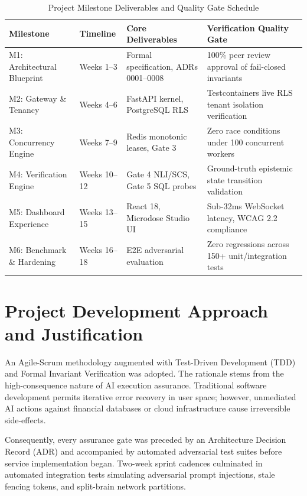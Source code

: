 \documentclass[12pt,a4paper]{report}
\numberwithin{equation}{section}
\begin{document}
\begin{table}[h!]
\centering
\caption{Project Milestone Deliverables and Quality Gate Schedule}
\vspace{4pt}
\begin{tabularx}{\textwidth}{l l p{3.2cm} X}
\toprule
\textbf{Milestone} & \textbf{Timeline} & \textbf{Core Deliverables} & \textbf{Verification Quality Gate} \\
\midrule
M1: Architectural Blueprint & Weeks 1--3 & Formal specification, ADRs 0001--0008 & 100\% peer review approval of fail-closed invariants \\
M2: Gateway \& Tenancy & Weeks 4--6 & FastAPI kernel, PostgreSQL RLS & Testcontainers live RLS tenant isolation verification \\
M3: Concurrency Engine & Weeks 7--9 & Redis monotonic leases, Gate 3 & Zero race conditions under 100 concurrent workers \\
M4: Verification Engine & Weeks 10--12 & Gate 4 NLI/SCS, Gate 5 SQL probes & Ground-truth epistemic state transition validation \\
M5: Dashboard Experience & Weeks 13--15 & React 18, Microdose Studio UI & Sub-32ms WebSocket latency, WCAG 2.2 compliance \\
M6: Benchmark \& Hardening & Weeks 16--18 & E2E adversarial evaluation & Zero regressions across 150+ unit/integration tests \\
\bottomrule
\end{tabularx}
\end{table}

\section{Project Development Approach and Justification}
An Agile-Scrum methodology augmented with Test-Driven Development (TDD) and Formal Invariant Verification was adopted. The rationale stems from the high-consequence nature of AI execution assurance. Traditional software development permits iterative error recovery in user space; however, unmediated AI actions against financial databases or cloud infrastructure cause irreversible side-effects.

Consequently, every assurance gate was preceded by an Architecture Decision Record (ADR) and accompanied by automated adversarial test suites before service implementation began. Two-week sprint cadences culminated in automated integration tests simulating adversarial prompt injections, stale fencing tokens, and split-brain network partitions.
\end{document}
